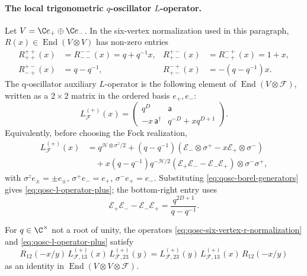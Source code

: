 \paragraph{The local trigonometric \(q\)-oscillator \(L\)-operator.}
Let \(V=\C e_+\oplus\C e_-\).  In the six-vertex normalization used in
this paragraph, \(R(x)\in\operatorname{End}(V\otimes V)\) has non-zero entries
\begin{align}
  R^{++}_{++}(x)&=R^{--}_{--}(x)=q+q^{-1}x,&
  R^{+-}_{+-}(x)&=R^{-+}_{-+}(x)=1+x,\nonumber\\
  R^{+-}_{-+}(x)&=q-q^{-1},&
  R^{-+}_{+-}(x)&=-(q-q^{-1})x .
  \label{eq:qosc-six-vertex-r-normalization}
\end{align}
The q-oscillator auxiliary \(L\)-operator is the following element of
\(\operatorname{End}(V\otimes\mathcal F)\), written as a \(2\times2\) matrix
in the ordered basis \(e_+,e_-\):
\begin{equation}
  L_{\mathcal F}^{(+)}(x)=
  \begin{pmatrix}
    q^D&\mathsf a\\
    -x\,\mathsf a^\dagger&q^{-D}+xq^{D+1}
  \end{pmatrix}.
  \label{eq:qosc-l-operator-plus}
\end{equation}
Equivalently, before choosing the Fock realization,
\begin{align}
  L_{\mathcal F}^{(+)}(x)
  &=
  q^{\mathcal H\otimes\sigma^z/2}
  +(q-q^{-1})(\mathcal E_-\otimes\sigma^+
      -x\mathcal E_+\otimes\sigma^-)
  \nonumber\\
  &\quad
  +x(q-q^{-1})q^{-\mathcal H/2}
  (\mathcal E_+\mathcal E_--\mathcal E_-\mathcal E_+)
  \otimes\sigma^-\sigma^+ ,
  \label{eq:qosc-l-operator-borel-form}
\end{align}
with \(\sigma^z e_\pm=\pm e_\pm\), \(\sigma^+e_-=e_+\),
\(\sigma^-e_+=e_-\).  Substituting
\eqref{eq:qosc-borel-generators} gives
\eqref{eq:qosc-l-operator-plus}; the bottom-right entry uses
\[
  \mathcal E_+\mathcal E_- - \mathcal E_-\mathcal E_+
  =
  \frac{q^{2D+1}}{q-q^{-1}}.
\]

\begin{proposition}
\label{prop:qosc-local-rll-identity}
For \(q\in\C^\times\) not a root of unity, the operators
\eqref{eq:qosc-six-vertex-r-normalization} and
\eqref{eq:qosc-l-operator-plus} satisfy
\begin{equation}
  R_{12}(-x/y)\,
  L^{(+)}_{\mathcal F,13}(x)\,
  L^{(+)}_{\mathcal F,23}(y)
  =
  L^{(+)}_{\mathcal F,23}(y)\,
  L^{(+)}_{\mathcal F,13}(x)\,
  R_{12}(-x/y)
  \label{eq:qosc-local-rll}
\end{equation}
as an identity in
\(\operatorname{End}(V\otimes V\otimes\mathcal F)\).
\end{proposition}

